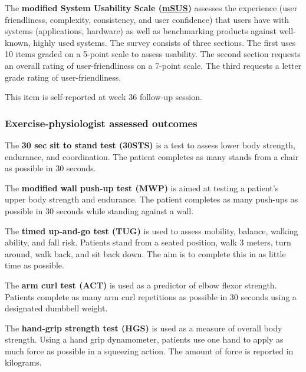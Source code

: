 \documentclass[11pt,parskip=half-]{scrartcl}
\begin{document}
\label{outcome:msus}
The \textbf{modified System Usability Scale (\hyperref[analysis:msus]{mSUS})} assesses the experience (user friendliness, complexity, consistency, and user confidence) that users have with systems (applications, hardware) as well as benchmarking products against well-known, highly used systems. The survey consists of three sections. The first uses 10 items graded on a 5-point scale to assess usability. The second section requests an overall rating of user-friendliness on a 7-point scale. The third requests a letter grade rating of user-friendliness.

This item is self-reported at week 36 follow-up session.

\subsubsection{Exercise-physiologist assessed outcomes}\label{epa-outcomes}

\label{outcome:30sts}
The \textbf{30 sec sit to stand test (30STS)} \cites{rikli1999development}{jones199930}{macfarlane2006validity} is a test to assess lower body strength, endurance, and coordination. The patient completes as many stands from a chair as possible in 30 seconds.

\label{outcome:mwp}
The \textbf{modified wall push-up test (MWP)} is aimed at testing a patient’s upper body strength and endurance. The patient completes as many push-ups as possible in 30 seconds while standing against a wall.

\label{outcome:tug}
The \textbf{timed up-and-go test (TUG)} \cites{podsiadlo1991timed}{shumway2000predicting} is used to assess mobility, balance, walking ability, and fall risk. Patients stand from a seated position, walk 3 meters, turn around, walk back, and sit back down. The aim is to complete this in as little time as possible.

\label{outcome:act}
The \textbf{arm curl test (ACT)} \cites{rikli1999development}{liu2017predicting} is used as a predictor of elbow flexor strength. Patients complete as many arm curl repetitions as possible in 30 seconds using a designated dumbbell weight.

\label{outcome:hgs}
The \textbf{hand-grip strength test (HGS)} \cite{liu2017predicting} is used as a measure of overall body strength. Using a hand grip dynamometer, patients use one hand to apply as much force as possible in a squeezing action. The amount of force is reported in kilograms.
\end{document}
